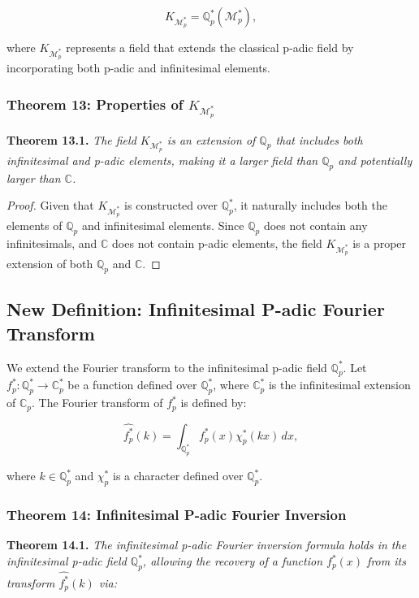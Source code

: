 \documentclass{article}
\begin{document}
\[
K_{\mathcal{M}_{p}^*} = \mathbb{Q}_{p}^*(\mathcal{M}_{p}^*),
\]

where \(K_{\mathcal{M}_{p}^*}\) represents a field that extends the classical p-adic field by incorporating both p-adic and infinitesimal elements.

\subsubsection{Theorem 13: Properties of \(K_{\mathcal{M}_{p}^*}\)}
\textbf{Theorem 13.1.} \textit{The field \(K_{\mathcal{M}_{p}^*}\) is an extension of \(\mathbb{Q}_p\) that includes both infinitesimal and p-adic elements, making it a larger field than \(\mathbb{Q}_p\) and potentially larger than \(\mathbb{C}\).}

\begin{proof}
Given that \(K_{\mathcal{M}_{p}^*}\) is constructed over \(\mathbb{Q}_{p}^*\), it naturally includes both the elements of \(\mathbb{Q}_p\) and infinitesimal elements. Since \(\mathbb{Q}_p\) does not contain any infinitesimals, and \(\mathbb{C}\) does not contain p-adic elements, the field \(K_{\mathcal{M}_{p}^*}\) is a proper extension of both \(\mathbb{Q}_p\) and \(\mathbb{C}\).
\end{proof}

\subsection{New Definition: Infinitesimal P-adic Fourier Transform}
We extend the Fourier transform to the infinitesimal p-adic field \(\mathbb{Q}_{p}^*\). Let \(f_p^*: \mathbb{Q}_{p}^* \to \mathbb{C}_p^*\) be a function defined over \(\mathbb{Q}_{p}^*\), where \(\mathbb{C}_p^*\) is the infinitesimal extension of \(\mathbb{C}_p\). The Fourier transform of \(f_p^*\) is defined by:

\[
\widehat{f_p^*}(k) = \int_{\mathbb{Q}_{p}^*} f_p^*(x) \chi_p^*(kx) \, dx,
\]

where \(k \in \mathbb{Q}_{p}^*\) and \(\chi_p^*\) is a character defined over \(\mathbb{Q}_{p}^*\).

\subsubsection{Theorem 14: Infinitesimal P-adic Fourier Inversion}
\textbf{Theorem 14.1.} \textit{The infinitesimal p-adic Fourier inversion formula holds in the infinitesimal p-adic field \(\mathbb{Q}_{p}^*\), allowing the recovery of a function \(f_p^*(x)\) from its transform \(\widehat{f_p^*}(k)\) via:}
\end{document}
